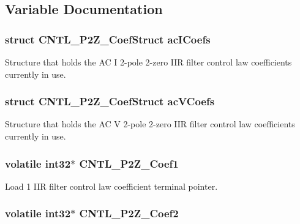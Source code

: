 \subsection{Variable Documentation}
\hypertarget{a00014_a05ea1ba581ea8bf1eb5c44f15534d31c}{
\subsubsection[{ac\-I\-Coefs}]{\setlength{\rightskip}{0pt plus 5cm}struct C\-N\-T\-L\-\_\-P2\-Z\-\_\-\-Coef\-Struct ac\-I\-Coefs}}\label{a00014_a05ea1ba581ea8bf1eb5c44f15534d31c}
Structure that holds the A\-C I 2-\/pole 2-\/zero I\-I\-R filter control law coefficients currently in use. \hypertarget{a00014_a07dbef418ea85cb169ebfc52e9571d68}{
\subsubsection[{ac\-V\-Coefs}]{\setlength{\rightskip}{0pt plus 5cm}struct C\-N\-T\-L\-\_\-P2\-Z\-\_\-\-Coef\-Struct ac\-V\-Coefs}}\label{a00014_a07dbef418ea85cb169ebfc52e9571d68}
Structure that holds the A\-C V 2-\/pole 2-\/zero I\-I\-R filter control law coefficients currently in use. \hypertarget{a00014_a047c759a71b80d8cfd5e6f52b1b021b9}{
\subsubsection[{C\-N\-T\-L\-\_\-2\-P2\-Z\-\_\-\-Coef1}]{\setlength{\rightskip}{0pt plus 5cm}volatile int32$\ast$ C\-N\-T\-L\-\_\-P2\-Z\-\_\-\-Coef1}}\label{a00014_a047c759a71b80d8cfd5e6f52b1b021b9}
Load 1 I\-I\-R filter control law coefficient terminal pointer. \hypertarget{a00014_abdc599cbabc62898c49926678c3327e6}{
\subsubsection[{C\-N\-T\-L\-\_\-2\-P2\-Z\-\_\-\-Coef2}]{\setlength{\rightskip}{0pt plus 5cm}volatile int32$\ast$ C\-N\-T\-L\-\_\-P2\-Z\-\_\-\-Coef2}}\label{a00014_abdc599cbabc62898c49926678c3327e6}
